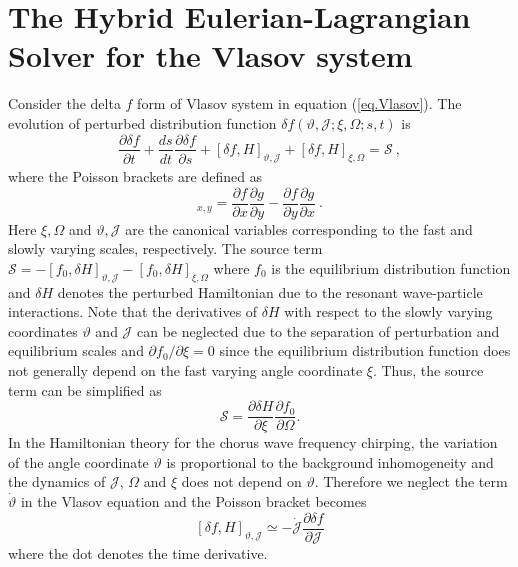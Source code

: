 \section{The Hybrid Eulerian-Lagrangian Solver for the Vlasov system}
\label{sec:vlasov}
Consider the  delta $f$ form of Vlasov system in equation (\ref{eq.Vlasov}). The evolution of  perturbed distribution function $\delta f(\vartheta,\mathcal{J};\xi,\Omega;s,t)$ is
\begin{equation}\label{eq.deltaf}
    \frac{\partial \delta f}{\partial t}+ \frac{d s_{}}{d t} \frac{\partial \delta f}{\partial s_{}} + \left[\delta f, H\right]_{\vartheta,\mathcal{J}} +  \left[\delta f, H\right]_{\xi,\Omega} = \mathcal{S}~,
\end{equation}
where the   Poisson brackets are defined as
\begin{equation}
    [f,~g]_{x,y} = \frac{\partial f}{\partial x}\frac{\partial g}{\partial y}-\frac{\partial f}{\partial y}\frac{\partial g}{\partial x}~.
\end{equation}
Here $\xi,\Omega$ and $\vartheta,\mathcal{J}$ are the canonical variables corresponding to the fast  and slowly varying scales, respectively.
The source term $\mathcal{S}= -\left[f_0, \delta H\right]_{\vartheta, \mathcal{J}} - \left[f_0, \delta H\right]_{\xi, \Omega}$ 
where $f_0$ is the equilibrium distribution function and $\delta H$ denotes the perturbed Hamiltonian due to the resonant wave-particle interactions.
Note that the derivatives of $\delta H$ with respect to the slowly varying coordinates $\vartheta$ and $\mathcal{J}$ can be neglected due to the separation  of perturbation and equilibrium scales
and $\partial f_0/\partial \xi=0$ 
since the equilibrium distribution function does not generally depend on the fast varying angle coordinate $\xi$.
Thus, the source term can be simplified as 
\begin{equation}
     \mathcal{S} = \frac{\partial \delta H}{\partial \xi}\frac{\partial f_0}{\partial \Omega}.
\end{equation}
In the Hamiltonian theory for the chorus wave frequency chirping, 
the variation of the angle coordinate $\vartheta$  is proportional to the background inhomogeneity 
and
 the dynamics of $\mathcal{J}$, $\Omega$ and $\xi$ 
 does not  depend on  $\vartheta$.  
Therefore we neglect the term $ \dot{\vartheta} $ in the Vlasov equation and the  Poisson bracket becomes
\begin{equation}
\left[\delta f, H\right]_{\vartheta,\mathcal{J}}\simeq 
 -\dot{\mathcal{J}} \frac{\partial \delta f}{\partial \mathcal{J}}      
\end{equation}
where the dot denotes the time derivative.

